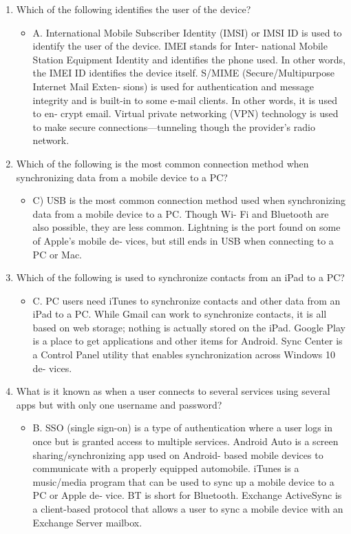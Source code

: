 \documentclass{article}
\begin{document}
\begin{enumerate}
     \item Which of the following identifies the user of the device?
    \begin{itemize}
        \item A. International Mobile Subscriber Identity (IMSI) or IMSI ID
is used to identify the user of the device. IMEI stands for Inter‐
national Mobile Station Equipment Identity and identifies the
phone used. In other words, the IMEI ID identifies the device
itself. S/MIME (Secure/Multipurpose Internet Mail Exten‐
sions) is used for authentication and message integrity and is
built-in to some e-mail clients. In other words, it is used to en‐
crypt email. Virtual private networking (VPN) technology is
used to make secure connections—tunneling though the
provider’s radio network.
    \end{itemize}
     \item Which of the following is the most common connection
method when synchronizing data from a mobile device to a
PC?
    \begin{itemize}
        \item C) USB is the most common connection method used when
synchronizing data from a mobile device to a PC. Though Wi-
Fi and Bluetooth are also possible, they are less common.
Lightning is the port found on some of Apple’s mobile de‐
vices, but still ends in USB when connecting to a PC or Mac.
    \end{itemize}
     \item Which of the following is used to synchronize contacts from an
iPad to a PC?
    \begin{itemize}
        \item C. PC users need iTunes to synchronize contacts and other data
from an iPad to a PC. While Gmail can work to synchronize
contacts, it is all based on web storage; nothing is actually
stored on the iPad. Google Play is a place to get applications
and other items for Android. Sync Center is a Control Panel
utility that enables synchronization across Windows 10 de‐
vices.
    \end{itemize}
     \item What is it known as when a user connects to several services
using several apps but with only one username and password?
    \begin{itemize}
        \item B. SSO (single sign-on) is a type of authentication where a user
logs in once but is granted access to multiple services. Android
Auto is a screen sharing/synchronizing app used on Android-
based mobile devices to communicate with a properly
equipped automobile. iTunes is a music/media program that
can be used to sync up a mobile device to a PC or Apple de‐
vice. BT is short for Bluetooth. Exchange ActiveSync is a
client-based protocol that allows a user to sync a mobile device
with an Exchange Server mailbox.
    \end{itemize}
\end{enumerate}
\end{document}
